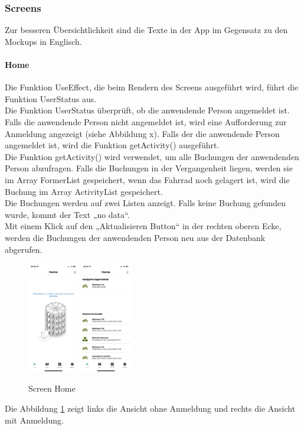 \subsubsection{Screens}Zur besseren Übersichtlichkeit sind die Texte in der App im Gegensatz zu den Mockups in Englisch.\\

\paragraph{Home}Die Funktion UseEffect, die beim Rendern des Screens ausgeführt wird, führt die Funktion UserStatus aus.\\
Die Funktion UserStatus überprüft, ob die anwendende Person angemeldet ist. Falls die anwendende Person nicht angemeldet ist, wird eine Aufforderung zur Anmeldung angezeigt (siehe Abbildung x). Falls der die anwendende Person angemeldet ist, wird die Funktion getActivity() ausgeführt. \\
Die Funktion getActivity() wird verwendet, um alle Buchungen der anwendenden Person abzufragen. Falls die Buchungen in der Vergangenheit liegen, werden sie im \Gls{Array} FormerList gespeichert, wenn das Fahrrad noch gelagert ist, wird die Buchung im \Gls{Array} ActivityList gespeichert. \\
Die Buchungen werden auf zwei Listen anzeigt. Falls keine Buchung gefunden wurde, kommt der Text „no data“. \\
Mit einem Klick auf den „Aktualisieren Button“ in der rechten oberen Ecke, werden die Buchungen der anwendenden Person neu aus der Datenbank abgerufen.\\
\begin{figure}[H]
  \centering
  \includegraphics[width=0.2\textwidth]{images/app-screenshots/screenhomeno.png}
  \includegraphics[width=0.2\textwidth]{images/app-screenshots/screenhomeyes.png}
  \caption{Screen Home}
  \label{fig:screenhome}
\end{figure}
Die Abbildung \ref{fig:screenhome} zeigt links die Ansicht ohne Anmeldung und rechts die Ansicht mit Anmeldung.


